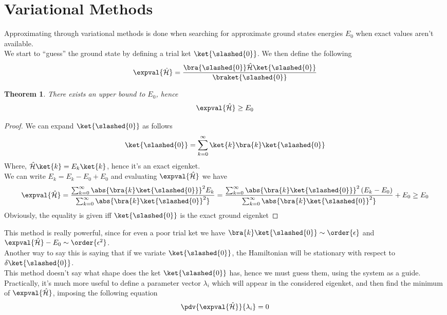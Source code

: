 \documentclass[a4paper, 11pt]{book}
\newcommand{\1}{\opr{\mathds{1}}}
\newcommand{\ham}{\mathcal{H}}
\newcommand{\opr}[1]{\hat{#1}}
\newcommand{\sla}[1]{\slashed{#1}}
\newtheorem{thm}{Theorem}
\theoremstyle{plain}
\begin{document}
	\section{Variational Methods}
	Approximating through variational methods is done when searching for approximate ground states energies $E_0$ when exact values aren't available.\\
	We start to ``guess''  the ground state by defining a trial ket $\ket{\sla{0}}$. We then define the following
	\begin{equation}
		\expval{\opr{\ham}}=\frac{\bra{\sla{0}}\opr{\ham}\ket{\sla{0}}}{\braket{\sla{0}}}
		\label{eq:slashed0ket}
	\end{equation}
	\begin{thm}
		There exists an upper bound to $E_0$, hence
		\begin{equation*}
			\expval{\opr{\ham}}\ge E_0
		\end{equation*}
	\end{thm}
	\begin{proof}
		We can expand $\ket{\sla{0}}$ as follows
		\begin{equation*}
			\ket{\sla{0}}=\sum_{k=0}^{\infty}\ket{k}\bra{k}\ket{\sla{0}}
		\end{equation*}
		Where, $\opr{\ham}\ket{k}=E_k\ket{k}$, hence it's an exact eigenket.\\
		We can write $E_k=E_k-E_0+E_0$ and evaluating $\expval{\opr{\ham}}$ we have
		\begin{equation*}
			\expval{\opr{\ham}}=\frac{\sum_{k=0}^{\infty}\abs{\bra{k}\ket{\sla{0}}}^2E_k}{\sum_{k=0}^{\infty}\abs{\bra{k}\ket{\sla{0}}^2}}=
			\frac{\sum_{k=0}^{\infty}\abs{\bra{k}\ket{\sla{0}}}^2\left( E_k-E_0 \right)}{\sum_{k=0}^{\infty}\abs{\bra{k}\ket{\sla{0}}^2}}+E_0\ge E_0
		\end{equation*}
		Obviously, the equality is given iff $\ket{\sla{0}}$ is the exact ground eigenket
	\end{proof}
	This method is really powerful, since for even a poor trial ket we have $\bra{k}\ket{\sla{0}}\sim\order{\epsilon}$ and $\expval{\opr{\ham}}-E_0\sim\order{\epsilon^2}$.\\
	Another way to say this is saying that if we variate $\ket{\sla{0}}$, the Hamiltonian will be stationary with respect to $\delta\ket{\sla{0}}$.\\
	This method doesn't say what shape does the ket $\ket{\sla{0}}$ has, hence we must guess them, using the system as a guide.\\
	Practically, it's much more useful to define a parameter vector $\lambda_i$ which will appear in the considered eigenket, and then find the minimum of $\expval{\opr{\ham}}$, imposing the following equation
	\begin{equation}
		\pdv{\expval{\opr{\ham}}}{\lambda_i}=0
		\label{eq:extremalvarmethod}
	\end{equation}
\end{document}
